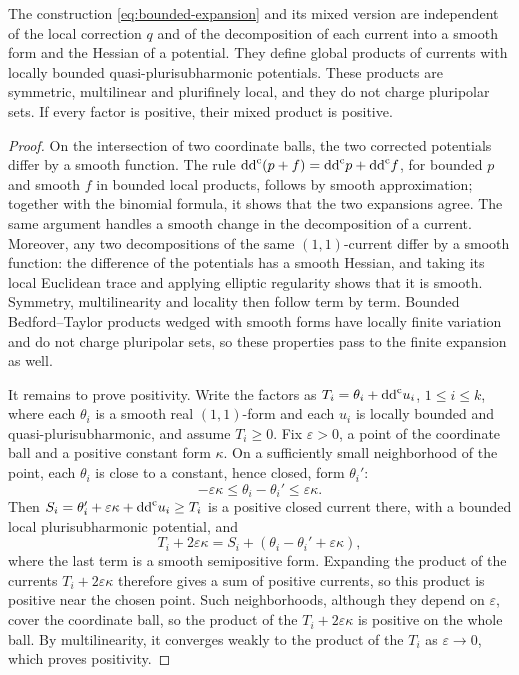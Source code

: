 \begin{proposition}\label{prop:bounded-products}
The construction \eqref{eq:bounded-expansion} and its mixed version are independent of the local correction $q$ and of the decomposition of each current into a smooth form and the Hessian of a potential. They define global products of currents with locally bounded quasi-plurisubharmonic potentials. These products are symmetric, multilinear and plurifinely local, and they do not charge pluripolar sets. If every factor is positive, their mixed product is positive.
\end{proposition}
\begin{proof}
On the intersection of two coordinate balls, the two corrected potentials differ by a smooth function. The rule $\mathrm{dd}^{\mathrm{c}}(p+f)=\mathrm{dd}^{\mathrm{c}} p+\mathrm{dd}^{\mathrm{c}} f$, for bounded $p$ and smooth $f$ in bounded local products, follows by smooth approximation; together with the binomial formula, it shows that the two expansions agree. The same argument handles a smooth change in the decomposition of a current. Moreover, any two decompositions of the same $(1,1)$-current differ by a smooth function: the difference of the potentials has a smooth Hessian, and taking its local Euclidean trace and applying elliptic regularity shows that it is smooth. Symmetry, multilinearity and locality then follow term by term. Bounded Bedford--Taylor products wedged with smooth forms have locally finite variation and do not charge pluripolar sets, so these properties pass to the finite expansion as well.

It remains to prove positivity. Write the factors as $T_i=\theta_i+\mathrm{dd}^{\mathrm{c}} u_i$, $1\leq i\leq k$, where each $\theta_i$ is a smooth real $(1,1)$-form and each $u_i$ is locally bounded and quasi-plurisubharmonic, and assume $T_i\geq0$. Fix $\varepsilon>0$, a point of the coordinate ball and a positive constant form $\kappa$. On a sufficiently small neighborhood of the point, each $\theta_i$ is close to a constant, hence closed, form $\theta_i'$:
\[
 -\varepsilon\kappa\leq\theta_i-\theta_i'
 \leq\varepsilon\kappa.
\]
Then
$S_i=\theta_i'+\varepsilon\kappa+\mathrm{dd}^{\mathrm{c}} u_i\geq T_i$ is a positive closed current there, with a bounded local plurisubharmonic potential, and
\[
 T_i+2\varepsilon\kappa
 =S_i+(\theta_i-\theta_i'+\varepsilon\kappa),
\]
where the last term is a smooth semipositive form. Expanding the product of the currents $T_i+2\varepsilon\kappa$ therefore gives a sum of positive currents, so this product is positive near the chosen point. Such neighborhoods, although they depend on $\varepsilon$, cover the coordinate ball, so the product of the $T_i+2\varepsilon\kappa$ is positive on the whole ball. By multilinearity, it converges weakly to the product of the $T_i$ as $\varepsilon\to0$, which proves positivity.
\end{proof}

